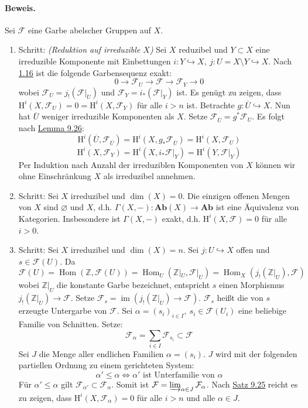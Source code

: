 \paragraph{Beweis.} Sei $\mathcal{F}$ eine Garbe abelscher Gruppen auf $X$.
\begin{enumerate}
\item Schritt: \textit{(Reduktion auf irreduzible $X$)} Sei $X$ reduzibel und $Y\subset X$ eine irreduzible Komponente mit Einbettungen $i:Y\hookrightarrow X,\ j:U=X\setminus Y\hookrightarrow X$. Nach \hyperref[1.16]{1.16} ist die folgende Garbensequenz exakt:
\[0\longrightarrow \mathcal{F}_U \longrightarrow\mathcal{F}\longrightarrow\mathcal{F}_Y\longrightarrow 0 \]
wobei $\mathcal{F}_U= j_!(\mathcal{F}|_U)$ und $\mathcal{F}_Y=i_\ast(\mathcal{F}|_Y)$ ist. Es genügt zu zeigen, dass $\mathrm{H}^i(X,\mathcal{F}_U)=0=\mathrm{H}^i(X,\mathcal{F}_Y)$ für alle $i>n$ ist. Betrachte $g:\overline{U}\hookrightarrow X$. Nun hat $\overline{U}$ weniger irreduzible Komponenten als $X$. Setze $\mathcal{F}_{\overline{U}}=g^\ast\mathcal{F}_U$. Es folgt nach \hyperref[9.26]{Lemma 9.26}:
\[\mathrm{H}^i(\overline{U},\mathcal{F}_{\overline{U}})=\mathrm{H}^i(X,g_\ast\mathcal{F}_{\overline{U}}) = \mathrm{H}^i(X,\mathcal{F}_U) \]
\[\mathrm{H}^i(X,\mathcal{F}_Y)=\mathrm{H}^i(X,i_\ast\mathcal{F}|_Y)=\mathrm{H}^i(Y,\mathcal{F}|_Y) \]
Per Induktion nach Anzahl der irreduziblen Komponenten von $X$ können wir ohne Einschränkung $X$ als irreduzibel annehmen.
\item Schritt: Sei $X$ irreduzibel und $\dim(X)=0$. Die einzigen offenen Mengen von $X$ sind $\varnothing$ und $X$, d.h. $\Gamma(X,-):\mathbf{Ab}(X)\to\mathbf{Ab}$ ist eine Äquivalenz von Kategorien. Insbesondere ist $\Gamma(X,-)$ exakt, d.h. $\mathrm{H}^i(X,\mathcal{F})=0$ für alle $i>0$.
\item Schritt: Sei $X$ irreduzibel und $\dim(X)=n$. Sei $j:U\hookrightarrow X$ offen und $s\in\mathcal{F}(U)$. Da
\[\mathcal{F}(U)=\operatorname{Hom}(\mathbb{Z},\mathcal{F}(U))=\operatorname{Hom}_U(\mathbb{Z}|_U,\mathcal{F}|_U)=\operatorname{Hom}_X(j_!(\mathbb{Z}|_U),\mathcal{F}) \]
wobei $\mathbb{Z}|_U$ die konstante Garbe bezeichnet, entspricht $s$ einen Morphismus $j_!(\mathbb{Z}|_U)\to\mathcal{F}$. Setze $\mathcal{F}_s=\operatorname{im}(j_!(\mathbb{Z}|_U)\to\mathcal{F})$. $\mathcal{F}_s$ heißt die von $s$ erzeugte Untergarbe von $\mathcal{F}$. Sei $\alpha=(s_i)_{i\in I},\ s_i\in\mathcal{F}(U_i)$ eine beliebige Familie von Schnitten. Setze:
\[\mathcal{F}_\alpha = \sum_{i\in I}\mathcal{F}_{s_i}\subset\mathcal{F}\]
Sei $J$ die Menge aller endlichen Familien $\alpha=(s_i)$. $J$ wird mit der folgenden par\-tiel\-len Ordnung zu einem gerichteten System:
\[\alpha'\leq\alpha\iff \alpha'\text{ ist Unterfamilie von }\alpha \]
Für $\alpha'\leq\alpha$ gilt $\mathcal{F}_{\alpha'}\subset\mathcal{F}_\alpha$. Somit ist $\mathcal{F}=\varinjlim_{\alpha\in J}\mathcal{F}_\alpha$. Nach \hyperref[9.25]{Satz 9.25} reicht es zu zeigen, dass $\mathrm{H}^i(X,\mathcal{F}_\alpha)=0$ für alle $i>n$ und alle $\alpha\in J$.


\end{enumerate}
